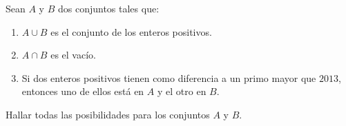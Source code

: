 Sean $A$ y $B$ dos conjuntos tales que:
\begin{enumerate}
   \item  $A \cup B$ es el conjunto de los enteros positivos.
   \item  $A \cap B$ es el vacío.
   \item  Si dos enteros positivos tienen como diferencia a un primo mayor que $2013$, entonces uno de ellos está en $A$ y el otro en $B$.
 \end{enumerate} 
Hallar todas las posibilidades para los conjuntos $A$ y $B$.
